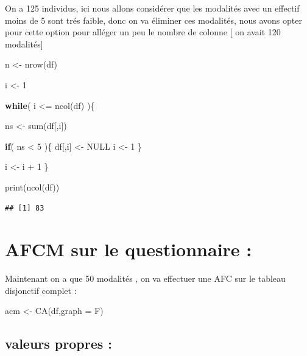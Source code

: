 \documentclass[
]{article}
\newenvironment{Shaded}{\begin{snugshade}}{\end{snugshade}}
\newcommand{\AttributeTok}[1]{\textcolor[rgb]{0.77,0.63,0.00}{#1}}
\newcommand{\ConstantTok}[1]{\textcolor[rgb]{0.00,0.00,0.00}{#1}}
\newcommand{\ControlFlowTok}[1]{\textcolor[rgb]{0.13,0.29,0.53}{\textbf{#1}}}
\newcommand{\DecValTok}[1]{\textcolor[rgb]{0.00,0.00,0.81}{#1}}
\newcommand{\FunctionTok}[1]{\textcolor[rgb]{0.00,0.00,0.00}{#1}}
\newcommand{\NormalTok}[1]{#1}
\newcommand{\OtherTok}[1]{\textcolor[rgb]{0.56,0.35,0.01}{#1}}
\newcommand{\SpecialCharTok}[1]{\textcolor[rgb]{0.00,0.00,0.00}{#1}}
\begin{document}
On a 125 individus, ici nous allons considérer que les modalités avec un
effectif moins de 5 sont trés faible, donc on va éliminer ces modalités,
nous avons opter pour cette option pour alléger un peu le nombre de
colonne {[} on avait 120 modalités{]}

\begin{Shaded}
\begin{Highlighting}[]
\NormalTok{n }\OtherTok{\textless{}{-}} \FunctionTok{nrow}\NormalTok{(df)}

\NormalTok{i }\OtherTok{\textless{}{-}} \DecValTok{1}

\ControlFlowTok{while}\NormalTok{( i }\SpecialCharTok{\textless{}=} \FunctionTok{ncol}\NormalTok{(df) )\{}

\NormalTok{  ns }\OtherTok{\textless{}{-}} \FunctionTok{sum}\NormalTok{(df[,i])}


  \ControlFlowTok{if}\NormalTok{( ns }\SpecialCharTok{\textless{}} \DecValTok{5}\NormalTok{  )\{}
\NormalTok{    df[,i] }\OtherTok{\textless{}{-}} \ConstantTok{NULL}
\NormalTok{    i }\OtherTok{\textless{}{-}} \DecValTok{1}
\NormalTok{  \}}

\NormalTok{  i }\OtherTok{\textless{}{-}}\NormalTok{ i }\SpecialCharTok{+} \DecValTok{1}
\NormalTok{\}}

\FunctionTok{print}\NormalTok{(}\FunctionTok{ncol}\NormalTok{(df))}
\end{Highlighting}
\end{Shaded}

\begin{verbatim}
## [1] 83
\end{verbatim}

\hypertarget{afcm-sur-le-questionnaire}{%
\section{AFCM sur le questionnaire :}\label{afcm-sur-le-questionnaire}}

Maintenant on a que 50 modalités , on va effectuer une AFC sur le
tableau disjonctif complet :

\begin{Shaded}
\begin{Highlighting}[]
\NormalTok{acm }\OtherTok{\textless{}{-}} \FunctionTok{CA}\NormalTok{(df,}\AttributeTok{graph =}\NormalTok{ F)}
\end{Highlighting}
\end{Shaded}

\hypertarget{valeurs-propres}{%
\subsection{valeurs propres :}\label{valeurs-propres}}
\end{document}
